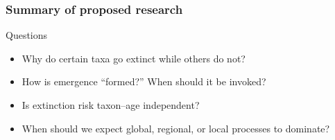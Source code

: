 \documentclass{beamer} \usepackage{amsmath,amsthm}
\begin{document}
\begin{frame}
  \frametitle{Summary of proposed research}

  \begin{alertblock}{Questions}
    \begin{itemize}
      \item Why do certain taxa go extinct while others do not?
      \item How is emergence ``formed?'' When should it be invoked?
      \item Is extinction risk taxon--age independent?
      \item When should we expect global, regional, or local processes to dominate?
    \end{itemize}
  \end{alertblock}
\end{frame}
\end{document}

